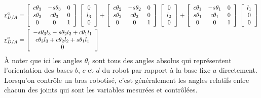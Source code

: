 \begin{align}
\underline{r}_{D/A}^a &= \left[ \begin{array}{c c c}
	c\theta_3 & -s\theta_3 & 0 \\
	s\theta_3 & c\theta_3 & 0 \\
	0 & 0 & 1 
\end{array}  \right] \, \left[ \begin{array}{c} 
0 \\ l_3 \\ 0
\end{array} \right] + \left[ \begin{array}{c c c}
	c\theta_2 & -s\theta_2 & 0 \\
	s\theta_2 & c\theta_2 & 0 \\
	0 & 0 & 1 
\end{array}  \right] \, \left[ \begin{array}{c} 
0 \\ l_2 \\ 0
\end{array} \right]  + \left[ \begin{array}{c c c}
	c\theta_1 & -s\theta_1 & 0 \\
	s\theta_1 & c\theta_1 & 0 \\
	0 & 0 & 1 
\end{array}  \right] \, \left[ \begin{array}{c} 
l_1 \\ 0 \\ 0
\end{array} \right] \\
\underline{r}_{D/A}^a &= \left[ \begin{array}{c}
-s\theta_3 l_3 - s\theta_2 l_2  + c\theta_1 l_1 \\
c\theta_3 l_3 + c\theta_2 l_2  + s\theta_1 l_1  \\
0
\end{array} \right]
\label{eq:robot2dpos}
\end{align} 
À noter que ici les angles $\theta_i$ sont tous des angles absolus qui représentent l'orientation des bases $b$, $c$ et $d$ du robot par rapport à la base fixe $a$ directement. Lorsqu'on contrôle un bras robotisé, c'est généralement les angles relatifs entre chacun des joints qui sont les variables mesurées et contrôlées. 



